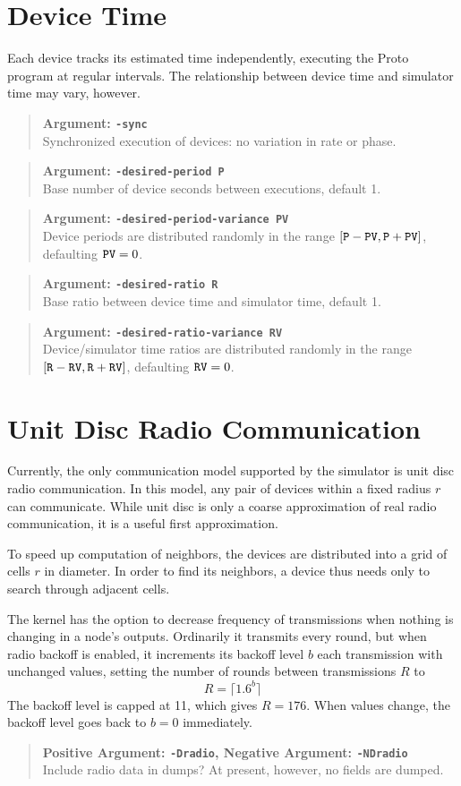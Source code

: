 \documentclass{article}
\newcommand\var[1]{{\tt #1}}
\newcommand\simarg[2]{\begin{quote} {\bf Argument: \var{#1}} \\ #2 \end{quote}}
\newcommand\simPMarg[3]{
  \begin{quote}
    {\bf Positive Argument: \var{#1}, Negative Argument: \var{#2}} \\ #3
  \end{quote}
}
\begin{document}
\section{Device Time}

Each device tracks its estimated time independently, executing the
Proto program at regular intervals.  The relationship between device
time and simulator time may vary, however.

\simarg{-sync}{Synchronized execution of devices: no variation in rate
  or phase.}

\simarg{-desired-period P}{Base number of device seconds between
  executions, default 1.}
\simarg{-desired-period-variance PV}{Device periods are distributed randomly
  in the range $[\var{P}-\var{PV},\var{P}+\var{PV}]$, defaulting $\var{PV}=0$.}
\simarg{-desired-ratio R}{Base ratio between device time and simulator time,
  default 1.}
\simarg{-desired-ratio-variance RV}{Device/simulator time ratios are
  distributed randomly in the range
  $[\var{R}-\var{RV},\var{R}+\var{RV}]$, defaulting $\var{RV}=0$.}


\section{Unit Disc Radio Communication}

Currently, the only communication model supported by the simulator
is unit disc radio communication.  In this model, any pair of devices
within a fixed radius $r$ can communicate.  While unit disc is only a coarse
approximation of real radio communication, it is a useful first 
approximation.  

To speed up computation of neighbors, the devices are distributed into
a grid of cells $r$ in diameter.  In order to find its neighbors, a
device thus needs only to search through adjacent cells.

The kernel has the option to decrease frequency of transmissions when
nothing is changing in a node's outputs.  Ordinarily it transmits
every round, but when radio backoff is enabled, it increments its
backoff level $b$ each transmission with unchanged values, setting the
number of rounds between transmissions $R$ to
$$R = \lceil{1.6^{b}}\rceil$$
The backoff level is capped at 11, which gives $R=176$.  When values
change, the backoff level goes back to $b=0$ immediately.

\simPMarg{-Dradio}{-NDradio}{Include radio data in dumps?  At present,
    however, no fields are dumped.}
\end{document}
